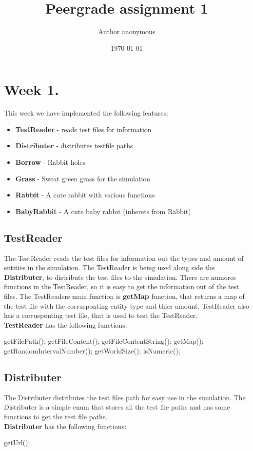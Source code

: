 \documentclass[11pt]{article}
\begin{document}
    \title{Peergrade assignment 1}
    \author{Author anonymous} %
    \date{\today}

    \section*{Week 1. }
    This week we have implemented the following features:
    \begin{itemize}
        \item \textbf{TestReader} - reads test files for information
        \item \textbf{Distributer} - distributes testfile paths
        \item \textbf{Borrow} - Rabbit holes
        \item \textbf{Grass} - Sweat green grass for the simulation
        \item \textbf{Rabbit} - A cute rabbit with various functions
        \item \textbf{BabyRabbit} - A cute baby rabbit (inherets from Rabbit)
    \end{itemize}

    \subsection*{TestReader}
    The TestReader reads the test files for information out the types and amount of entities in the simulation. The TestReader is being used along side the \textbf{Distributer}, to distribute the test files to the simulation.
    There are numores functions in the TestReader, so it is easy to get the information out of the test files. 
    The TestReaders main function is \textbf{getMap} function, that returns a map of the test file with the corrusponting entity type and thier amount. 
    TestReader also has a corrusponting test file, that is used to test the TestReader.
    \\
    \textbf{TestReader} has the following functions:
    \begin{mdframed}
        getFilePath(); getFileContent(); getFileContentString(); getMap(); getRandomIntervalNumber(); getWorldSize(); isNumeric();
    \end{mdframed}
    \subsection*{Distributer}
    The Distributer distributes the test files path for easy use in the simulation. The Distributer is a simple enum that stores all the test file paths and has some functions to get the test file paths.
    \\
    \textbf{Distributer} has the following functions:
    \begin{mdframed}
        getUrl();
    \end{mdframed}
\end{document}
